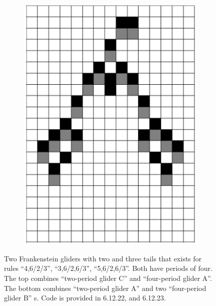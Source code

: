 \documentclass[12pt]{article}
\numberwithin{figure}{section} %
\begin{document}
\begin{figure}[H]
\begin{subfigure}{0.19\textwidth}
     \includegraphics[width=\linewidth]{Section4/26.4}
     \subcaption{}
   \end{subfigure}
   \setcounter{subfigure}{0}
\caption{Two Frankenstein gliders with two and three tails that exists for rules “4,6/2/3”, “3,6/2,6/3”, “5,6/2,6/3”. Both have periods of four. The top combines “two-period glider C” and “four-period glider A”. The bottom combines “two-period glider A” and two “four-period glider B” s. Code is provided in 6.12.22, and 6.12.23. }
\end{figure}
\vspace{-1cm}
\end{document}
